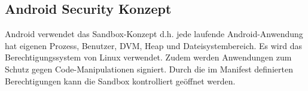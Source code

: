 \subsection{Android Security Konzept}

Android verwendet das Sandbox-Konzept d.h. jede laufende Android-Anwendung hat eigenen Prozess, Benutzer, DVM, Heap und Dateisystembereich. Es wird das Berechtigungssystem von Linux verwendet. Zudem werden Anwendungen zum Schutz gegen Code-Manipulationen signiert. Durch die im Manifest definierten Berechtigungen kann die Sandbox kontrolliert geöffnet werden.